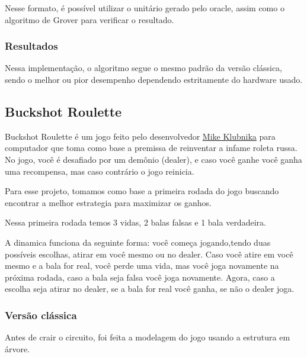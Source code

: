 \documentclass{article}
\begin{document}
Nesse formato, é possível utilizar o unitário gerado pelo oracle, assim como o algoritmo de Grover para verificar o resultado.

\subsubsection{Resultados}

Nessa implementação, o algoritmo segue o mesmo padrão da versão clássica, sendo o melhor ou pior desempenho dependendo estritamente do hardware usado.


\subsection{Buckshot Roulette} \label{buckshot}

Buckshot Roulette é um jogo feito pelo desenvolvedor \href{https://mikeklubnika.itch.io/}{Mike Klubnika} para computador que toma como base a premissa de reinventar a infame roleta russa. No jogo, você é desafiado por um demônio (dealer), e caso você ganhe você ganha uma recompensa, mas caso contrário o jogo reinicia.

Para esse projeto, tomamos como base a primeira rodada do jogo buscando encontrar a melhor estrategia para maximizar os ganhos.

Nessa primeira rodada temos 3 vidas, 2 balas falsas e 1 bala verdadeira.

A dinamica funciona da seguinte forma: você começa jogando,tendo duas possíveis escolhas, atirar em você mesmo ou no dealer. Caso você atire em você mesmo e a bala for real, você perde uma vida, mas você joga novamente na próxima rodada, caso a bala seja falsa você joga novamente. Agora, caso a escolha seja atirar no dealer, se a bala for real você ganha, se não o dealer joga.


\subsubsection{Versão clássica}

Antes de crair o circuito, foi feita a modelagem do jogo usando a estrutura em árvore.
\end{document}
